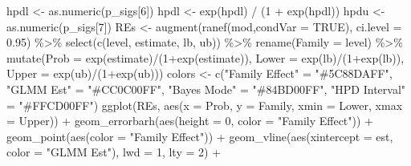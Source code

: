\documentclass[12pt]{article}
\newenvironment{Shaded}{\begin{snugshade}}{\end{snugshade}}
\newcommand{\AttributeTok}[1]{\textcolor[rgb]{0.77,0.63,0.00}{#1}}
\newcommand{\ConstantTok}[1]{\textcolor[rgb]{0.00,0.00,0.00}{#1}}
\newcommand{\DecValTok}[1]{\textcolor[rgb]{0.00,0.00,0.81}{#1}}
\newcommand{\FloatTok}[1]{\textcolor[rgb]{0.00,0.00,0.81}{#1}}
\newcommand{\FunctionTok}[1]{\textcolor[rgb]{0.00,0.00,0.00}{#1}}
\newcommand{\NormalTok}[1]{#1}
\newcommand{\OtherTok}[1]{\textcolor[rgb]{0.56,0.35,0.01}{#1}}
\newcommand{\SpecialCharTok}[1]{\textcolor[rgb]{0.00,0.00,0.00}{#1}}
\newcommand{\StringTok}[1]{\textcolor[rgb]{0.31,0.60,0.02}{#1}}
\begin{document}
\begin{Shaded}
\begin{Highlighting}[]
\NormalTok{hpdl }\OtherTok{\textless{}{-}} \FunctionTok{as.numeric}\NormalTok{(p\_sigs[}\DecValTok{6}\NormalTok{])}
\NormalTok{hpdl }\OtherTok{\textless{}{-}} \FunctionTok{exp}\NormalTok{(hpdl) }\SpecialCharTok{/}\NormalTok{ (}\DecValTok{1} \SpecialCharTok{+} \FunctionTok{exp}\NormalTok{(hpdl))}
\NormalTok{hpdu }\OtherTok{\textless{}{-}} \FunctionTok{as.numeric}\NormalTok{(p\_sigs[}\DecValTok{7}\NormalTok{])}
\NormalTok{REs }\OtherTok{\textless{}{-}} \FunctionTok{augment}\NormalTok{(}\FunctionTok{ranef}\NormalTok{(mod,}\AttributeTok{condVar =} \ConstantTok{TRUE}\NormalTok{), }\AttributeTok{ci.level =} \FloatTok{0.95}\NormalTok{) }\SpecialCharTok{\%\textgreater{}\%}
  \FunctionTok{select}\NormalTok{(}\FunctionTok{c}\NormalTok{(level, estimate, lb, ub)) }\SpecialCharTok{\%\textgreater{}\%}
  \FunctionTok{rename}\NormalTok{(}\AttributeTok{Family =}\NormalTok{ level) }\SpecialCharTok{\%\textgreater{}\%}
  \FunctionTok{mutate}\NormalTok{(}\AttributeTok{Prob =} \FunctionTok{exp}\NormalTok{(estimate)}\SpecialCharTok{/}\NormalTok{(}\DecValTok{1}\SpecialCharTok{+}\FunctionTok{exp}\NormalTok{(estimate)),}
         \AttributeTok{Lower =} \FunctionTok{exp}\NormalTok{(lb)}\SpecialCharTok{/}\NormalTok{(}\DecValTok{1}\SpecialCharTok{+}\FunctionTok{exp}\NormalTok{(lb)),}
         \AttributeTok{Upper =} \FunctionTok{exp}\NormalTok{(ub)}\SpecialCharTok{/}\NormalTok{(}\DecValTok{1}\SpecialCharTok{+}\FunctionTok{exp}\NormalTok{(ub)))}
\NormalTok{colors }\OtherTok{\textless{}{-}} \FunctionTok{c}\NormalTok{(}\StringTok{"Family Effect"} \OtherTok{=} \StringTok{"\#5C88DAFF"}\NormalTok{, }\StringTok{"GLMM Est"} \OtherTok{=} \StringTok{"\#CC0C00FF"}\NormalTok{, }\StringTok{"Bayes Mode"} \OtherTok{=} \StringTok{"\#84BD00FF"}\NormalTok{,}
            \StringTok{"HPD Interval"} \OtherTok{=} \StringTok{"\#FFCD00FF"}\NormalTok{)}
\FunctionTok{ggplot}\NormalTok{(REs, }\FunctionTok{aes}\NormalTok{(}\AttributeTok{x =}\NormalTok{ Prob, }\AttributeTok{y =}\NormalTok{ Family, }\AttributeTok{xmin =}\NormalTok{ Lower, }\AttributeTok{xmax =}\NormalTok{ Upper)) }\SpecialCharTok{+}
  \FunctionTok{geom\_errorbarh}\NormalTok{(}\FunctionTok{aes}\NormalTok{(}\AttributeTok{height =} \DecValTok{0}\NormalTok{, }\AttributeTok{color =} \StringTok{"Family Effect"}\NormalTok{)) }\SpecialCharTok{+}
  \FunctionTok{geom\_point}\NormalTok{(}\FunctionTok{aes}\NormalTok{(}\AttributeTok{color =} \StringTok{"Family Effect"}\NormalTok{)) }\SpecialCharTok{+}
  \FunctionTok{geom\_vline}\NormalTok{(}\FunctionTok{aes}\NormalTok{(}\AttributeTok{xintercept =}\NormalTok{ est, }\AttributeTok{color =} \StringTok{"GLMM Est"}\NormalTok{), }\AttributeTok{lwd =} \DecValTok{1}\NormalTok{, }\AttributeTok{lty =} \DecValTok{2}\NormalTok{) }\SpecialCharTok{+}

\end{Highlighting}
\end{Shaded}
\end{document}
